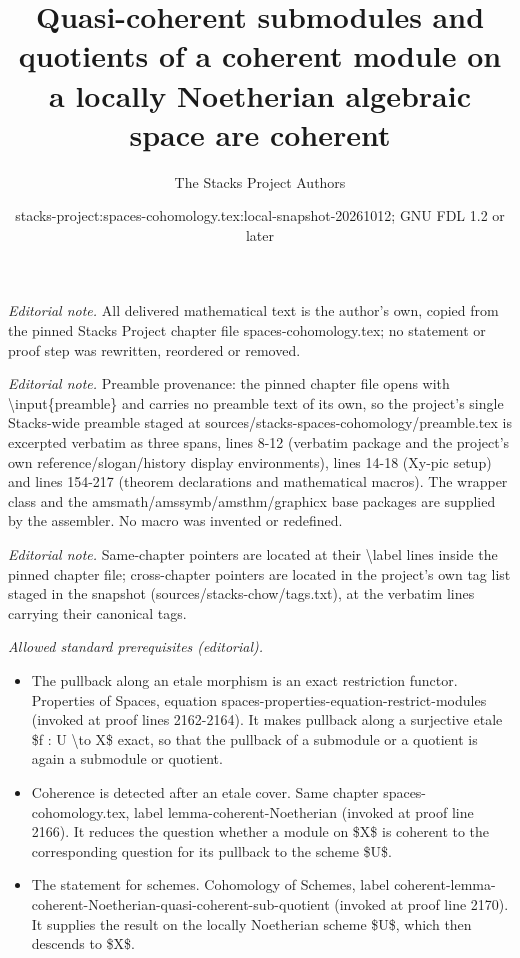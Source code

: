\documentclass[10pt,a4paper]{amsart}
\title{Quasi-coherent submodules and quotients of a coherent module on a locally Noetherian algebraic space are coherent}
\author{The Stacks Project Authors}
\date{stacks-project:spaces-cohomology.tex:local-snapshot-20261012; GNU FDL 1.2 or later}
\theoremstyle{plain}
\theoremstyle{definition}
\theoremstyle{remark}
\numberwithin{equation}{subsection}
\begin{document}
\maketitle
\noindent\textit{Editorial note.} All delivered mathematical text is the author's own, copied from the pinned Stacks Project chapter file spaces-cohomology.tex; no statement or proof step was rewritten, reordered or removed.\par\medskip
\noindent\textit{Editorial note.} Preamble provenance: the pinned chapter file opens with \textbackslash{}input\{preamble\} and carries no preamble text of its own, so the project's single Stacks-wide preamble staged at sources/stacks-spaces-cohomology/preamble.tex is excerpted verbatim as three spans, lines 8-12 (verbatim package and the project's own reference/slogan/history display environments), lines 14-18 (Xy-pic setup) and lines 154-217 (theorem declarations and mathematical macros). The wrapper class and the amsmath/amssymb/amsthm/graphicx base packages are supplied by the assembler. No macro was invented or redefined.\par\medskip
\noindent\textit{Editorial note.} Same-chapter pointers are located at their \textbackslash{}label lines inside the pinned chapter file; cross-chapter pointers are located in the project's own tag list staged in the snapshot (sources/stacks-chow/tags.txt), at the verbatim lines carrying their canonical tags.\par\medskip
\noindent\textit{Allowed standard prerequisites (editorial).}\begin{itemize}
\item The pullback along an etale morphism is an exact restriction functor. Properties of Spaces, equation spaces-properties-equation-restrict-modules (invoked at proof lines 2162-2164). It makes pullback along a surjective etale \$f : U \textbackslash{}to X\$ exact, so that the pullback of a submodule or a quotient is again a submodule or quotient.
\item Coherence is detected after an etale cover. Same chapter spaces-cohomology.tex, label lemma-coherent-Noetherian (invoked at proof line 2166). It reduces the question whether a module on \$X\$ is coherent to the corresponding question for its pullback to the scheme \$U\$.
\item The statement for schemes. Cohomology of Schemes, label coherent-lemma-coherent-Noetherian-quasi-coherent-sub-quotient (invoked at proof line 2170). It supplies the result on the locally Noetherian scheme \$U\$, which then descends to \$X\$.
\end{itemize}\medskip
\end{document}
